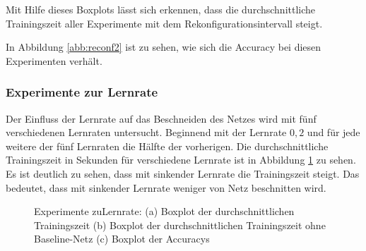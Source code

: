  Mit Hilfe dieses Boxplots lässt sich erkennen, dass die durchschnittliche Trainingszeit aller Experimente mit dem Rekonfigurationsintervall steigt.
 
 In Abbildung \ref{abb:reconf2} ist zu sehen, wie sich die Accuracy bei diesen Experimenten verhält.
 
\subsubsection{Experimente zur Lernrate}
Der Einfluss der Lernrate auf das Beschneiden des Netzes wird mit fünf verschiedenen Lernraten untersucht. Beginnend mit der Lernrate $0,2$ und für jede weitere der fünf Lernraten die Hälfte der vorherigen.
Die durchschnittliche Trainingszeit in Sekunden für verschiedene Lernrate ist in Abbildung \ref{abb:lr} zu sehen. Es ist deutlich zu sehen, dass mit sinkender Lernrate die Trainingszeit steigt. Das bedeutet, dass mit sinkender Lernrate weniger von Netz beschnitten wird.
 
 \begin{figure}
     \centering
     \hfill
     \caption{Experimente zuLernrate: (a) Boxplot der durchschnittlichen Trainingszeit (b) Boxplot der durchschnittlichen Trainingszeit ohne Baseline-Netz (c) Boxplot der Accuracys}
     \label{abb:lr}
\end{figure}

